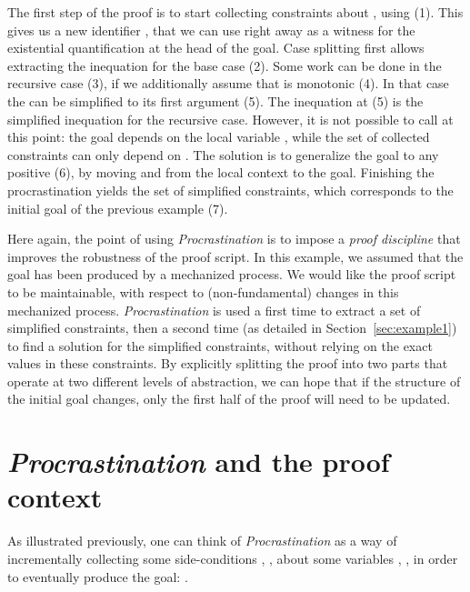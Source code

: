 \documentclass[xetex,format=acmlarge,screen=true,authorversion=true]{acmart-modified}
\begin{document}
\vspace{1em}



\vspace{1em}

The first step of the proof is to start collecting constraints about ,
using  (1). This gives us a new identifier
, that we can use right away as a witness for the existential
quantification at the head of the goal. Case splitting first allows extracting
the inequation for the base case (2). Some work can be done in the recursive
case (3), if we additionally assume that  is monotonic (4). In that case
the  can be simplified to its first argument (5). The inequation at
(5) is the simplified inequation for the recursive case. However, it is not
possible to call  at this point: the goal depends on the local
variable , while the set of collected constraints can only depend on
. The solution is to generalize the goal to any positive  (6), by
moving  and  from the local context to the goal. Finishing the
procrastination yields the set of simplified constraints, which corresponds to
the initial goal of the previous example (7).

Here again, the point of using \emph{Procrastination} is to impose a \emph{proof
  discipline} that improves the robustness of the proof script. In this example,
we assumed that the goal has been produced by a mechanized process. We would
like the proof script to be maintainable, with respect to (non-fundamental)
changes in this mechanized process. \emph{Procrastination} is used a first time
to extract a set of simplified constraints, then a second time (as detailed in
Section~\ref{sec:example1}) to find a solution for the simplified constraints,
without relying on the exact values in these constraints. By explicitly
splitting the proof into two parts that operate at two different levels of
abstraction, we can hope that if the structure of the initial goal changes, only
the first half of the proof will need to be updated.

\section{\emph{Procrastination} and the proof context}

As illustrated previously, one can think of \emph{Procrastination} as a way of
incrementally collecting some side-conditions , ,  about some
variables , ,  in order to eventually produce the goal:
.
\end{document}
